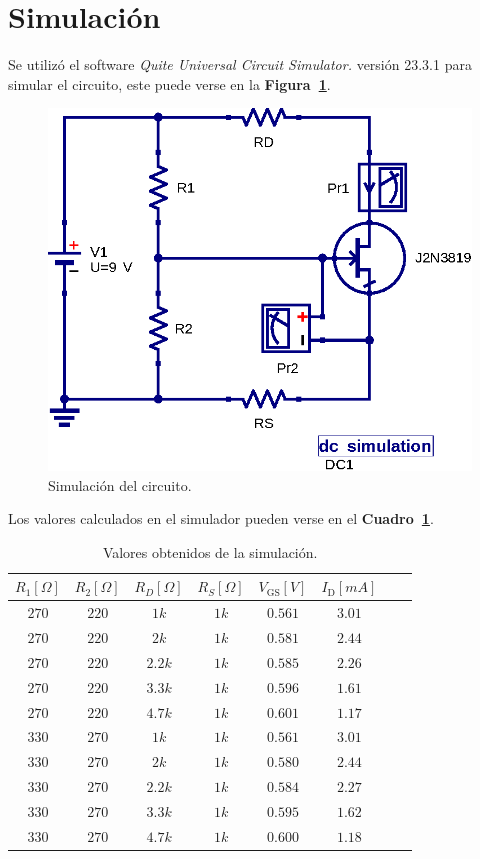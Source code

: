 \documentclass[letter,twoside,11pt]{article}
\begin{document}
\section{Simulación}
Se utilizó el software \emph{Quite Universal Circuit Simulator.} versión 23.3.1
para simular el circuito, este puede verse en la
\textbf{Figura~\ref{simulacion1}}.

\begin{figure}[!h]
\centering
\includegraphics[scale=1.0]{simulacion/2N3819.eps}
\caption{Simulación del circuito.}
\label{simulacion1}
\end{figure}

Los valores calculados en el simulador pueden verse en el
\textbf{Cuadro~\ref{simulacion2}}.

\begin{table}[!h]
\begin{center}
    \begin{tabular}{|c|c|c|c||c|c|c|c|}
    \hline
    $R_1[\Omega]$ & $R_2[\Omega]$ & $R_D[\Omega]$ & $R_S[\Omega]$ &
    $V_{\text{GS}}[V]$ &
    $I_{\text{D}}[m{A}]$
    \tabularnewline \hline \hline
    $270$ & $220$ & $  1k$ & $1k$ & $0.561$ & $3.01$ \tabularnewline \hline
    $270$ & $220$ & $  2k$ & $1k$ & $0.581$ & $2.44$ \tabularnewline \hline
    $270$ & $220$ & $2.2k$ & $1k$ & $0.585$ & $2.26$ \tabularnewline \hline
    $270$ & $220$ & $3.3k$ & $1k$ & $0.596$ & $1.61$ \tabularnewline \hline
    $270$ & $220$ & $4.7k$ & $1k$ & $0.601$ & $1.17$ \tabularnewline \hline
    $330$ & $270$ & $  1k$ & $1k$ & $0.561$ & $3.01$ \tabularnewline \hline
    $330$ & $270$ & $  2k$ & $1k$ & $0.580$ & $2.44$ \tabularnewline \hline
    $330$ & $270$ & $2.2k$ & $1k$ & $0.584$ & $2.27$ \tabularnewline \hline
    $330$ & $270$ & $3.3k$ & $1k$ & $0.595$ & $1.62$ \tabularnewline \hline
    $330$ & $270$ & $4.7k$ & $1k$ & $0.600$ & $1.18$ \tabularnewline \hline
    \end{tabular}
\end{center}
\caption{Valores obtenidos de la simulación.}
\label{simulacion2}
\end{table}
\end{document}
